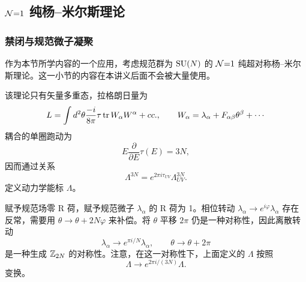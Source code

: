 \subsection{$\mathcal{N}{=}1$ 纯杨--米尔斯理论}\label{sec:n=1pure}
\subsubsection{禁闭与规范微子凝聚}
作为本节所学内容的一个应用，考虑规范群为 $\mathop{\mathrm{SU}}(N)$ 的 $\mathcal{N}{=}1$ 纯超对称杨--米尔斯理论。这一小节的内容在本讲义后面不会被大量使用。

该理论只有矢量多重态，拉格朗日量为
\begin{equation}
L=\int d^2\theta \frac{-i}{8\pi}\tau \mathop{\mathrm{tr}}\nolimits W_\alpha W^\alpha+ cc., \qquad
W_\alpha=\lambda_\alpha + F_{\alpha\beta}\theta^\beta + \cdots
\end{equation}
耦合的单圈跑动为
\begin{equation}
E\frac{\partial}{\partial E}\tau(E) = 3N,
\end{equation}
因而通过关系
\begin{equation}
\Lambda^{3N}= e^{2\pi i\tau_{UV} }\Lambda_{UV}^{3N}.
\end{equation}
定义动力学能标 $\Lambda$。

赋予规范场零 R 荷，赋予规范微子 $\lambda_\alpha$ 的 R 荷为 1。相位转动 $\lambda_\alpha\to e^{i\varphi}\lambda_\alpha$ 存在反常，需要用 $\theta\to\theta+2N\varphi$ 来补偿。将 $\theta$ 平移 $2\pi$ 仍是一种对称性，因此离散转动
\begin{equation}
\lambda_\alpha \to e^{\pi i/N} \lambda_\alpha, \qquad \theta\to \theta+2\pi
\end{equation}
是一种生成 $\mathbb{Z}_{2N}$ 的对称性。注意，在这一对称性下，上面定义的 $\Lambda$ 按照
\begin{equation}
\Lambda \to e^{2\pi i/(3N)} \Lambda.\label{lambdatrans}
\end{equation}
变换。

